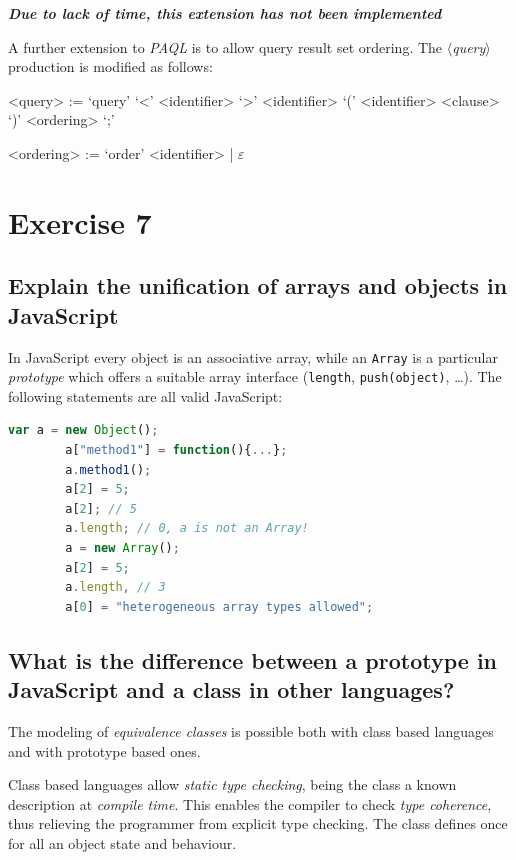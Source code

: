 \documentclass[10pt]{article}  %
\begin{document}
    \begin{center}
        \textbf{\emph{Due to lack of time, this extension has not been implemented}}
    \end{center}

    A further extension to \emph{PAQL} is to allow query result set ordering. The $\langle$\emph{query}$\rangle$ production is modified as follows:
    \vspace{1em}
    \begin{mdframed}
        \begin{grammar}
            <query> := `query' `<' <identifier> `>' <identifier> `(' <identifier> <clause> `)' <ordering> `;'

            <ordering> := `order' <identifier> | $\varepsilon$
        \end{grammar}
    \end{mdframed}
    \vspace{1em}
\section{Exercise 7}
    \subsection{Explain the unification of arrays and objects in JavaScript}
    In JavaScript every object is an associative array, while an \texttt{Array} is a particular \emph{prototype}
    which offers a suitable array interface (\texttt{length}, \texttt{push(object)}, \ldots).
    The following statements are all valid JavaScript:
    \begin{lstlisting}[language=JavaScript]
        var a = new Object();
        a["method1"] = function(){...};
        a.method1();
        a[2] = 5;
        a[2]; // 5
        a.length; // 0, a is not an Array!
        a = new Array();
        a[2] = 5;
        a.length, // 3
        a[0] = "heterogeneous array types allowed";
    \end{lstlisting}
    \subsection{What is the difference between a prototype in JavaScript and a class in other languages?}
    The modeling of \emph{equivalence classes} is possible both with class based languages and with prototype based ones.

    Class based languages allow \emph{static type checking}, being the class a known description at \emph{compile time}.
    This enables the compiler to check \emph{type coherence}, thus relieving the programmer from explicit type checking.
    The class defines once for all an object state and behaviour.
\end{document}
